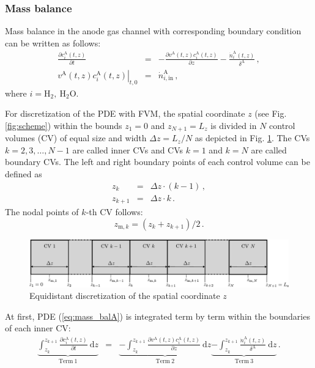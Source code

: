 \documentclass[pdftex,a4paper, 12pt]{article}
\begin{document}
\subsubsection*{Mass balance}
%
Mass balance in the anode gas channel with corresponding boundary condition can be written as follows:
%
\begin{eqnarray}
	\frac{\partial c_{i}^{\mathrm{A}}(t,z)}{\partial t} &=&-\frac{\partial v^{\mathrm{A}}(t,z) c_{i}^{\mathrm{A}}(t,z)}{\partial z}-\frac{\dot{n}_{i}^{\mathrm{A}}(t,z)}{\delta^{\mathrm{A}}} \, , \label{eq:mass_balA} \\
	\left. v^{\mathrm{A}}(t,z) c_{i}^{\mathrm{A}}(t,z) \right|_{t,0} &=&\dot{n}_{i, \mathrm{\mathrm{in}}}^{\mathrm{A}} \, , \label{eq:mass_balA_bc}
\end{eqnarray}
%
where $i = \mathrm{H_2}, ~\mathrm{H_2O}$.
%
\par
%
For discretization of the PDE with FVM, the spatial coordinate $z$ (see Fig. \ref{fig:scheme}) within the bounds $z_1 = 0$ and $z_{N+1}=L_{z}$ is divided in $N$ control volumes (CV) of equal size and width $\Delta z = L_{z}/N$ as depicted in Fig. \ref{fig:FVM_grid}. The CVs $k = 2,3,\dots,N-1$ are called inner CVs and CVs $k=1$ and $k=N$ are called boundary CVs. The left and right boundary points of each control volume can be defined as
%
%
\begin{eqnarray}
	z_k &=& \Delta z \cdot (k-1) \, , \\
	z_{k+1} &=& \Delta z \cdot k \, .
\end{eqnarray}
%
The nodal points of $k$-th CV follows:
%
\begin{equation}
	z_{\mathrm{m},k} = (z_k + z_{k+1})/2 \, .
\end{equation}  
%
%
\begin{figure}[t]
	\centering
	\includegraphics[width=1\textwidth]{./figures/FVM_grid.pdf}
	\caption{Equidistant discretization of the spatial coordinate $z$}
	\label{fig:FVM_grid}
\end{figure}
%
%
At first, PDE (\ref{eq:mass_balA}) is integrated term by term within the boundaries of each inner CV:
%
\begin{eqnarray}
	\underbrace{ \int_{z_k}^{z_{k+1}} \frac{\partial c_{i}^{\mathrm{A}}(t,z)}{\partial t} ~\mathrm{d}z }_{\mathrm{Term~1}} &=& \underbrace{ - \int_{z_k}^{z_{k+1}} \frac{\partial v^{\mathrm{A}}(t,z) c_{i}^{\mathrm{A}}(t,z)}{\partial z} ~\mathrm{d}z }_{\mathrm{Term~2}}  \underbrace{- \int_{z_k}^{z_{k+1}} \frac{\dot{n}_{i}^{\mathrm{A}}(t,z)}{\delta^{\mathrm{A}}} ~\mathrm{d}z }_{\mathrm{Term~3}} \, . \label{eq:mass_balA_int}
\end{eqnarray}
\end{document}
